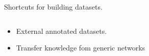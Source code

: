 \begin{frame}{Shortcuts for building datasets.}

\begin{columns}
\begin{column}{0.3\textwidth}
\begin{itemize}
\item External annotated datasets.
\item<2-3> Transfer knowledge fom generic networks
\end{itemize}
\end{column}
\begin{column}{0.65\textwidth}
\end{column}
\end{columns}
\end{frame}
